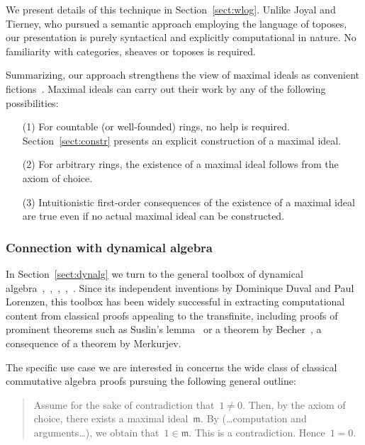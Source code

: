 \documentclass[envcountsect,envcountsame,runningheads]{llncs}
\newcommand{\mmm}{\mathfrak{m}}
\renewcommand{\_}{\mathpunct{.}\,}
\begin{document}
We present details of this technique in Section~\ref{sect:wlog}. Unlike
Joyal and Tierney, who pursued a semantic approach employing the language of
toposes, our presentation is purely syntactical and explicitly computational in
nature. No familiarity with categories, sheaves or toposes is required.

Summarizing, our approach strengthens the view of maximal ideals as convenient
fictions~\cite[Section~1]{schuster-wessel:krull}. Maximal ideals can carry out
their work by any of the following possibilities:
\begin{enumerate}
\item[(1)] For countable (or well-founded) rings, no help is required.
Section~\ref{sect:constr} presents an explicit construction of a maximal ideal.
\item[(2)] For arbitrary rings, the existence of a maximal ideal follows from the
axiom of choice.
\item[(3)] Intuitionistic first-order consequences of the existence of a maximal
ideal are true even if no actual maximal ideal can be constructed.
\end{enumerate}


\subsubsection{Connection with dynamical algebra}

In Section~\ref{sect:dynalg} we turn to the general toolbox of dynamical
algebra~\cite[Section~XV.6]{lombardi-quitte:constructive-algebra},~\cite{coquand-lombardi-roy:dynamicalmethod},~\cite{yengui:constructive},~\cite{duval:about},~\cite{neuwirth:lorenzen}. Since its
independent inventions by Dominique Duval and Paul
Lorenzen, this toolbox has been widely
successful in extracting computational content from classical proofs
appealing to the transfinite, including proofs of prominent theorems such as
Suslin's lemma~\cite{suslin:structure,yengui:maximal} or a theorem by
Becher~\cite{becher:csa}, a consequence of a theorem by Merkurjev.

The specific use case we are interested in concerns the wide class of classical
commutative algebra proofs pursuing the following general outline:
\begin{quote}\small Assume for the sake of contradiction that~$1 \neq 0$. Then, by the
axiom of choice, there exists a maximal ideal~$\mmm$. By (\ldots computation
and arguments\ldots\!), we obtain that~$1 \in \mmm$. This is a contradiction.
Hence~$1 = 0$.\end{quote}
\end{document}
